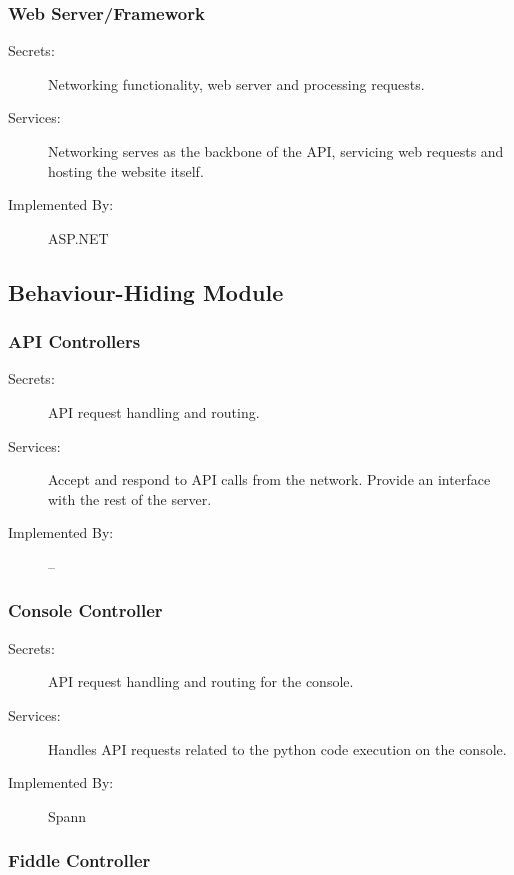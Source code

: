 \documentclass[12pt, titlepage]{article}
\begin{document}
\subsubsection{Web Server/Framework} \label{mdWebServer}
\begin{description}
\item[Secrets:] Networking functionality, web server and processing requests.
\item[Services:]Networking serves as the backbone of the API, servicing web
  requests and hosting the website itself.
\item[Implemented By:] ASP.NET
\end{description}

\subsection{Behaviour-Hiding Module}

\subsubsection{API Controllers} \label{mAPIControllers}

\begin{description}
\item[Secrets:] API request handling and routing.
\item[Services:] Accept and respond to API calls from the network. Provide an
    interface with the rest of the server.
\item[Implemented By:] --
\end{description}

\subsubsection{Console Controller} \label{mdConsoleController}

\begin{description}
\item[Secrets:] API request handling and routing for the console.
\item[Services:] Handles API requests related to the python code execution on
    the console.
\item[Implemented By:] Spann
\end{description}

\subsubsection{Fiddle Controller} \label{mdFiddleController}
\end{document}
